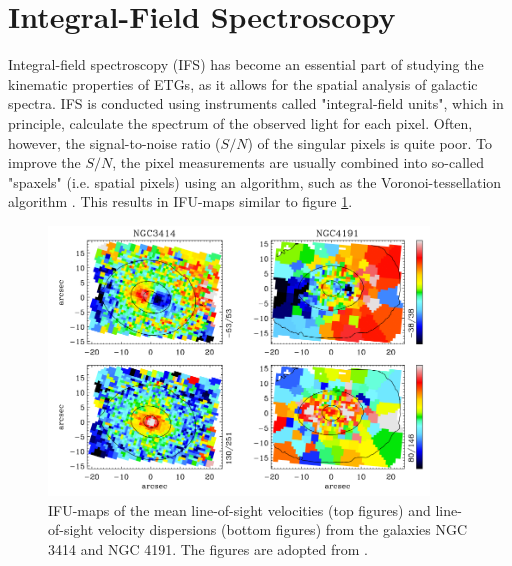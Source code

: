 \documentclass[english, twoside]{HYgradu}
\begin{document}
\section{Integral-Field Spectroscopy} \label{section:IFU}

Integral-field spectroscopy (IFS) has become an essential part of studying the kinematic properties of ETGs, as it allows for the spatial analysis of galactic spectra. IFS is conducted using instruments called "integral-field units", which in principle, calculate the spectrum of the observed light for each pixel. Often, however, the signal-to-noise ratio ($S/N$) of the singular pixels is quite poor. To improve the $S/N$, the pixel measurements are usually combined into so-called "spaxels" (i.e. spatial pixels) using an algorithm, such as the Voronoi-tessellation algorithm \citep{Cappellari2003}. This results in IFU-maps similar to figure \ref{figure:krajnovic_ifus}.

\begin{figure}
	\centering
	\includegraphics[width=0.9\textwidth]{krajnovic_ifus.png}
	\caption{IFU-maps of the mean line-of-sight velocities (top figures) and line-of-sight velocity dispersions (bottom figures) from the galaxies NGC 3414 and NGC 4191. The figures are adopted from \cite{Krajnovic2011}.}
	\label{figure:krajnovic_ifus}
\end{figure}
\end{document}
